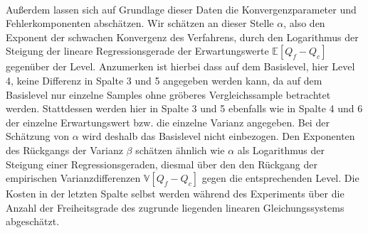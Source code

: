                                                                            \\
Außerdem lassen sich auf Grundlage dieser Daten die Konvergenzparameter und Fehlerkomponenten abschätzen. 
Wir schätzen an dieser Stelle $ \alpha $, also den Exponent der schwachen Konvergenz des Verfahrens, durch den Logarithmus der Steigung der lineare Regressionsgerade der Erwartungswerte $ \mathbb{E}[Q_f - Q_c] $ gegenüber der Level. Anzumerken ist hierbei dass auf dem Basislevel, hier Level 4, keine Differenz in Spalte 3 und 5 angegeben werden kann, da auf dem Basislevel nur einzelne Samples ohne gröberes Vergleichssample betrachtet werden. Stattdessen werden hier in Spalte 3 und 5 ebenfalls wie in Spalte 4 und 6 der einzelne Erwartungswert bzw. die einzelne Varianz angegeben. Bei der Schätzung von $ \alpha $ wird deshalb das Basislevel nicht einbezogen.
Den Exponenten des Rückgangs der Varianz $ \beta $ schätzen ähnlich wie $ \alpha $ als Logarithmus der Steigung einer Regressionsgeraden, diesmal über den den Rückgang der empirischen Varianzdifferenzen  $ \mathbb{V}[Q_f-Q_c] $ gegen die entsprechenden Level. Die Kosten in der letzten Spalte selbst werden während des Experiments über die Anzahl der Freiheitsgrade des zugrunde liegenden linearen Gleichungssystems abgeschätzt. 

